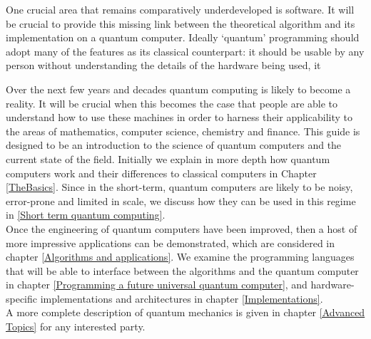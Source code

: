 One crucial area that remains comparatively underdeveloped is software. It will be crucial to provide this missing link between the theoretical algorithm and its implementation on a quantum computer. Ideally `quantum' programming should adopt many of the features as its classical counterpart: it should be usable by any person without understanding the details of the hardware being used, it 


Over the next few years and decades quantum computing is likely to become a reality. It will be crucial when this becomes the case that people are able to understand how to use these machines in order to harness their applicability to the areas of mathematics, computer science, chemistry and finance. This guide is designed to be an introduction to the science of quantum computers and the current state of the field. Initially we explain in more depth how quantum computers work and their differences to classical computers in Chapter \autoref{TheBasics}. Since in the short-term, quantum computers are likely to be noisy, error-prone and limited in scale, we discuss how they can be used in this regime in \autoref{Short term quantum computing}. \\

Once the engineering of quantum computers have been improved, then a host of more impressive applications can be demonstrated, which are considered in chapter \autoref{Algorithms and applications}. We examine the programming languages that will be able to interface between the algorithms and the quantum computer in chapter \autoref{Programming a future universal quantum computer}, and hardware-specific implementations and architectures in chapter \autoref{Implementations}. \\

A more complete description of quantum mechanics is given in chapter \autoref{Advanced Topics} for any interested party. 
